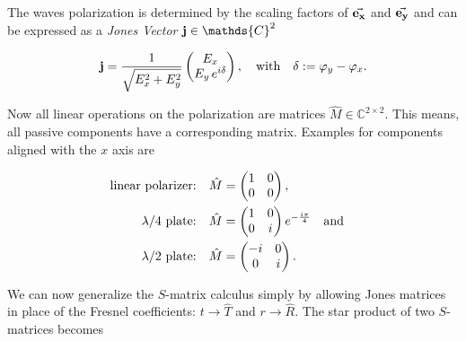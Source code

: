 \noindent
The waves polarization is determined by the scaling factors of $\va{e_x}$ and $\va{e_y}$ and can be expressed as a \textit{Jones Vector} $\vb j \in \mathds{C}^2$

\begin{equation}
   \vb j = \frac{1}{\sqrt{E_x^2 + E_y^2}}
   \begin{pmatrix}
       E_x\\
       E_y \, e^{i \delta}
   \end{pmatrix},
   \qq{with}
   \delta := \varphi_y - \varphi_x.
\end{equation}

\noindent
Now all linear operations on the polarization are matrices $\hat{M} \in \mathds{C}^{2 \times 2}$. This means, all passive components have a corresponding matrix. Examples for components aligned with the $x$ axis are


\begin{equation}
\begin{split}
   \qq*{linear polarizer:} \hat{M} &=
   \begin{pmatrix}
       1 & 0\\
       0 & 0
   \end{pmatrix},\\
   \qq*{$\lambda / 4$ plate:} \hat{M} &=
   \begin{pmatrix}
       1 & 0\\
       0 & i
   \end{pmatrix}
   e^{-\frac{i \pi}{4}}
   \qq{and}\\
   \qq*{$\lambda / 2$ plate:} \hat{M} &=
   \begin{pmatrix}
       -i & 0\\
       0 & i
   \end{pmatrix}.\\
\end{split}
\end{equation}

We can now generalize the $S$-matrix calculus simply by allowing Jones matrices in place of the Fresnel coefficients: $t \rightarrow \hat T$ and $r \rightarrow \hat R$. The star product of two $S$-matrices becomes

